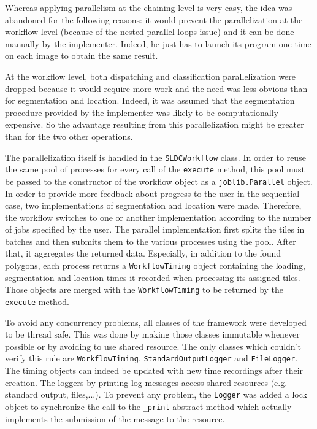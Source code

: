 Whereas applying parallelism at the chaining level is very easy, the idea was abandoned for the following reasons: it would prevent the parallelization at the workflow level (because of the nested parallel loops issue) and it can be done manually by the implementer. Indeed, he just has to launch its program one time on each image to obtain the same result.  

At the workflow level, both dispatching and classification parallelization were dropped because it would require more work and the need was less obvious than for segmentation and location. Indeed, it was assumed that the segmentation procedure provided by the implementer was likely to be computationally expensive. So the advantage resulting from this parallelization might be greater than for the two other operations. 

The parallelization itself is handled in the \texttt{SLDCWorkflow} class. In order to reuse the same pool of processes for every call of the \texttt{execute} method, this pool must be passed to the constructor of the workflow object as a \texttt{joblib.Parallel} object. In order to provide more feedback about progress to the user in the sequential case, two implementations of segmentation and location were made. Therefore, the workflow switches to one or another implementation according to the number of jobs specified by the user. The parallel implementation first splits the tiles in batches and then submits them to the various processes using the pool. After that, it aggregates the returned data. Especially, in addition to the found polygons, each process returns a \texttt{WorkflowTiming} object containing the loading, segmentation and location times it recorded when processing its assigned tiles. Those objects are merged with the \texttt{WorkflowTiming} to be returned by the \texttt{execute} method.

To avoid any concurrency problems, all classes of the framework were developed to be thread safe. This was done by making those classes immutable whenever possible or by avoiding to use shared resource. The only classes which couldn't verify this rule are \texttt{WorkflowTiming}, \texttt{StandardOutputLogger} and \texttt{FileLogger}. The timing objects can indeed be updated with new time recordings after their creation. The loggers by printing log messages access shared resources (e.g. standard output, files,...). To prevent any problem, the \texttt{Logger} was added a lock object to synchronize the call to the \texttt{\_print} abstract method which actually implements the submission of the message to the resource.

